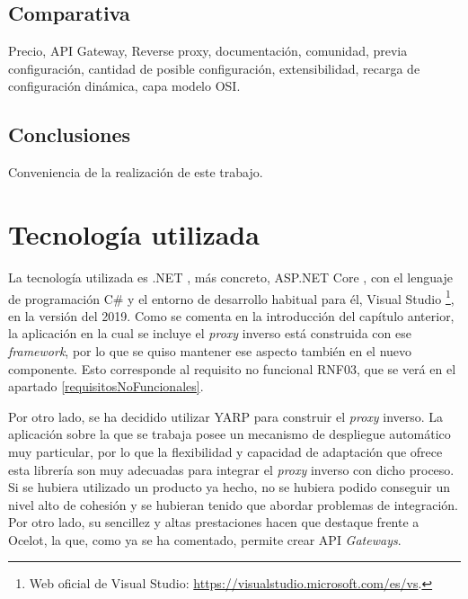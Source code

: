 \documentclass[11pt,spanish,listoffigures]{tfgetsinf}
\begin{document}

	\section{Comparativa}

Precio, API Gateway, Reverse proxy, documentación, comunidad, previa configuración, cantidad de posible configuración, extensibilidad, recarga de configuración dinámica, capa modelo OSI.


	\section{Conclusiones}

Conveniencia de la realización de este trabajo.


\chapter{Tecnología utilizada} \label{tecnologiaUtilizada}

La tecnología utilizada es .NET \cite{DotNet}, más concreto, ASP.NET Core \cite{DotNetCore}, con el lenguaje de programación C\# \cite{Csharp} y el entorno de desarrollo habitual para él, Visual Studio \footnote{Web oficial de Visual Studio: \url{https://visualstudio.microsoft.com/es/vs}.}, en la versión del 2019. Como se comenta en la introducción del capítulo anterior, la aplicación en la cual se incluye el \emph{proxy} inverso está construida con ese \emph{framework}, por lo que se quiso mantener ese aspecto también en el nuevo componente. Esto corresponde al requisito no funcional RNF03, que se verá en el apartado \ref{requisitosNoFuncionales}.

Por otro lado, se ha decidido utilizar YARP para construir el \emph{proxy} inverso. La aplicación sobre la que se trabaja posee un mecanismo de despliegue automático muy 
particular, por lo que la flexibilidad y capacidad de adaptación que ofrece esta librería son muy adecuadas para integrar el \emph{proxy} inverso con dicho proceso. Si se hubiera utilizado un producto ya hecho, no se hubiera podido conseguir un nivel alto de cohesión y se hubieran tenido que abordar problemas de integración. Por otro lado, su sencillez y altas prestaciones hacen que destaque frente a Ocelot, la que, como ya se ha comentado, permite crear API \emph{Gateways}.
\end{document}
